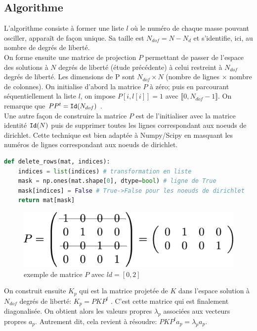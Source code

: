 \documentclass[a4paper, 12pt]{article}
\begin{document}
\subsection{Algorithme}
L'algorithme consiste à former une liste $l$ où le numéro de chaque masse pouvant osciller,
apparaît de façon unique. Sa
taille est $N_{dof}=N-N_d$ et s'identifie, ici,  au nombre de degrés de liberté. \\

On forme ensuite une matrice de projection $P$ permettant de passer de l'espace des solutions à $N$ degrés de 
liberté (étude précédente) à celui restreint à $N_{dof}$ degrés de liberté.
Les dimensions de P sont $N_{dof} \times N$ (nombre de lignes $\times$ nombre de colonnes).
On initialise d'abord la matrice $P$ à zéro;
puis en parcourant séquentiellement la liste $l$, on impose $P[i, l[i]]=1$ avec $\llbracket 0, N_{dof}-1  \rrbracket$.
On remarque que $P P^t = {\tt Id}(N_{dof})$ .\\

Une autre façon de construire la matrice $P$ est de l'initialiser avec  la matrice identité ${\tt Id}(N)$
puis de supprimer toutes les lignes correspondant aux noeuds de dirichlet. Cette technique
est bien adaptée à Numpy/Scipy en masquant les numéros de lignes correspondant aux noeuds de dirichlet.


\begin{lstlisting}[language=Python]
def delete_rows(mat, indices):
    indices = list(indices) # transformation en liste
    mask = np.ones(mat.shape[0], dtype=bool) # ligne de True
    mask[indices] = False # True->False pour les noeuds de dirichlet
    return mat[mask]
\end{lstlisting}

\begin{figure}[!h]
\centering
\includegraphics[scale=0.25]{matP.eps}
\caption{exemple de matrice $P$ avec $ld=[0, 2]$}
\label{matP}
\end{figure}

On construit ensuite $K_p$ qui est la matrice projetée de $K$ dans l'espace
solution à $N_ {dof}$ degrés de liberté: $K_p=P K P^t$ .
C'est cette matrice qui est finalement diagonalisée. On obtient alors les valeurs propres $\lambda_p$ associées
aux vecteurs propres $a_p$. Autrement dit, cela revient à résoudre:
$P K P^t a_p= \lambda_p a_p$.
\end{document}
